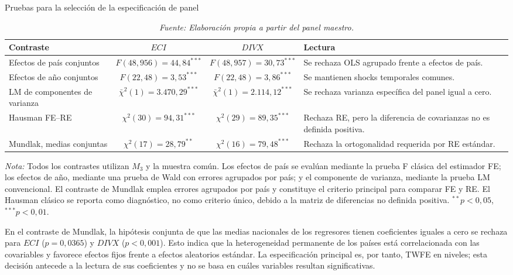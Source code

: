 \documentclass[../../TFM.tex]{subfiles}
\begin{document}
\begin{table}[htbp]
    \centering
    \caption{Pruebas para la selección de la especificación de panel}
    \label{tab:seleccion_estimador_panel}
    \begin{tabularx}{\textwidth}{@{}>{\RaggedRight\arraybackslash}p{}cc>{\RaggedRight\arraybackslash}X@{}}
        \toprule
        Contraste & $ECI$ & $DIVX$ & Lectura \\
        \midrule
        Efectos de país conjuntos
        & $F(48,956)=44,84^{***}$
        & $F(48,957)=30,73^{***}$
        & Se rechaza OLS agrupado frente a efectos de país. \\
        Efectos de año conjuntos
        & $F(22,48)=3,53^{***}$
        & $F(22,48)=3,86^{***}$
        & Se mantienen shocks temporales comunes. \\
        LM de componentes de varianza
        & $\bar{\chi}^{2}(1)=3.470,29^{***}$
        & $\bar{\chi}^{2}(1)=2.114,12^{***}$
        & Se rechaza varianza específica del panel igual a cero. \\
        Hausman FE--RE
        & $\chi^{2}(30)=94,31^{***}$
        & $\chi^{2}(29)=89,35^{***}$
        & Rechaza RE, pero la diferencia de covarianzas no es definida positiva. \\
        Mundlak, medias conjuntas
        & $\chi^{2}(17)=28,79^{**}$
        & $\chi^{2}(16)=79,48^{***}$
        & Rechaza la ortogonalidad requerida por RE estándar. \\
        \bottomrule
    \end{tabularx}
    \caption*{\footnotesize \textit{Nota:} Todos los contrastes utilizan $M_3$ y la muestra común. Los efectos de país se evalúan mediante la prueba F clásica del estimador FE; los efectos de año, mediante una prueba de Wald con errores agrupados por país; y el componente de varianza, mediante la prueba LM convencional. El contraste de Mundlak emplea errores agrupados por país y constituye el criterio principal para comparar FE y RE. El Hausman clásico se reporta como diagnóstico, no como criterio único, debido a la matriz de diferencias no definida positiva. $^{**}p<0,05$, $^{***}p<0,01$.}
    \caption*{\footnotesize \textit{Fuente: Elaboración propia a partir del panel maestro.}}
\end{table}

En el contraste de Mundlak, la hipótesis conjunta de que las medias nacionales
de los regresores tienen coeficientes iguales a cero se rechaza para $ECI$
($p=0,0365$) y $DIVX$ ($p<0,001$). Esto indica que la heterogeneidad permanente
de los países está correlacionada con las covariables y favorece efectos fijos
frente a efectos aleatorios estándar. La especificación principal es, por tanto,
TWFE en niveles; esta decisión antecede a la lectura de sus coeficientes y no se
basa en cuáles variables resultan significativas.
\end{document}
